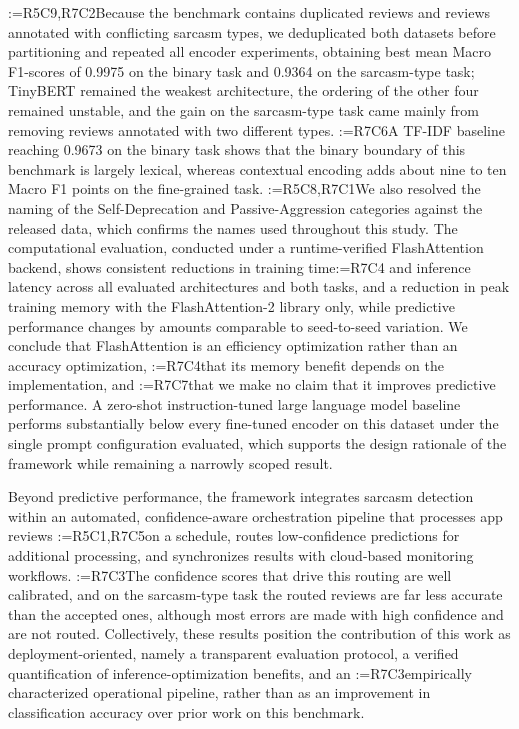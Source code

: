 \documentclass[a4paper,fleqn]{cas-sc}
\makeatletter
\newif\iftracked
\newcommand{\rv@setcolour}[1]{%
  \IfStrEq{#1}{R7C7}{\color{rvEdit}}{%
    \IfSubStr{#1}{R5}{\IfSubStr{#1}{R7}{\color{rvBoth}}{\color{rvFive}}}{\color{rvSeven}}}}
\newcommand{\rv@tag}[1]{\textsuperscript{\sffamily\bfseries\scriptsize[\StrSubstitute{#1}{,}{, }]}\,}
\newcommand{\rv@recordone}[1]{%
  \edef\rv@i{#1}%
  \ifcsdef{rv@n@\rv@i}{}{\csgdef{rv@n@\rv@i}{0}}%
  \csxdef{rv@n@\rv@i}{\the\numexpr\csuse{rv@n@\rv@i}+1\relax}%
  \begingroup\edef\@currentlabel{\rv@i}\label{rv:\rv@i:\csuse{rv@n@\rv@i}}\endgroup}
\newcommand{\rv@record}[1]{\@for\rv@id:=#1\do{\expandafter\rv@recordone\expandafter{\rv@id}}}
\DeclareRobustCommand{\rc}[2]{\rv@record{#1}\iftracked{\rv@setcolour{#1}\rv@tag{#1}#2}\else#2\fi}
\DeclareRobustCommand{\rcrep}[3]{\rv@record{#1}\iftracked{\rv@setcolour{#1}\rv@tag{#1}\rv@strike{#2} #3}\else#3\fi}
\DeclareRobustCommand{\rce}[1]{\rv@record{R7C7}\iftracked{\color{rvEdit}#1}\else#1\fi}
\makeatother
\begin{document}
\rc{R5C9,R7C2}{Because the benchmark contains duplicated reviews and reviews annotated with conflicting sarcasm types, we deduplicated both datasets before partitioning and repeated all encoder experiments, obtaining best mean Macro F1-scores of 0.9975 on the binary task and 0.9364 on the sarcasm-type task; TinyBERT remained the weakest architecture, the ordering of the other four remained unstable, and the gain on the sarcasm-type task came mainly from removing reviews annotated with two different types.} \rc{R7C6}{A TF-IDF baseline reaching 0.9673 on the binary task shows that the binary boundary of this benchmark is largely lexical, whereas contextual encoding adds about nine to ten Macro F1 points on the fine-grained task.} \rc{R5C8,R7C1}{We also resolved the naming of the Self-Deprecation and Passive-Aggression categories against the released data, which confirms the names used throughout this study.} The computational evaluation, conducted under a runtime-verified FlashAttention backend, shows consistent reductions in training time\rcrep{R7C4}{, inference latency, and peak GPU memory across all evaluated architectures and both tasks}{ and inference latency across all evaluated architectures and both tasks, and a reduction in peak training memory with the FlashAttention-2 library only}, while predictive performance changes by amounts comparable to seed-to-seed variation. We conclude that FlashAttention is an efficiency optimization rather than an accuracy optimization, \rc{R7C4}{that its memory benefit depends on the implementation, }and \rce{that} we make no claim that it improves predictive performance. A zero-shot instruction-tuned large language model baseline performs substantially below every fine-tuned encoder on this dataset under the single prompt configuration evaluated, which supports the design rationale of the framework while remaining a narrowly scoped result.

Beyond predictive performance, the framework integrates sarcasm detection within an automated, confidence-aware orchestration pipeline that processes app reviews \rcrep{R5C1,R7C5}{continuously}{on a schedule}, routes low-confidence predictions for additional processing, and synchronizes results with cloud-based monitoring workflows. \rc{R7C3}{The confidence scores that drive this routing are well calibrated, and on the sarcasm-type task the routed reviews are far less accurate than the accepted ones, although most errors are made with high confidence and are not routed.} Collectively, these results position the contribution of this work as deployment-oriented, namely a transparent evaluation protocol, a verified quantification of inference-optimization benefits, and an \rc{R7C3}{empirically characterized} operational pipeline, rather than as an improvement in classification accuracy over prior work on this benchmark.
\end{document}
